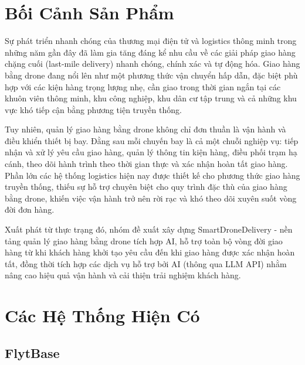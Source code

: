 \section{Bối Cảnh Sản Phẩm}

Sự phát triển nhanh chóng của thương mại điện tử và logistics thông minh trong những năm gần đây đã làm gia tăng đáng kể nhu cầu về các giải pháp giao hàng chặng cuối (last-mile delivery) nhanh chóng, chính xác và tự động hóa. Giao hàng bằng drone đang nổi lên như một phương thức vận chuyển hấp dẫn, đặc biệt phù hợp với các kiện hàng trọng lượng nhẹ, cần giao trong thời gian ngắn tại các khuôn viên thông minh, khu công nghiệp, khu dân cư tập trung và cả những khu vực khó tiếp cận bằng phương tiện truyền thống.

Tuy nhiên, quản lý giao hàng bằng drone không chỉ đơn thuần là vận hành và điều khiển thiết bị bay. Đằng sau mỗi chuyến bay là cả một chuỗi nghiệp vụ: tiếp nhận và xử lý yêu cầu giao hàng, quản lý thông tin kiện hàng, điều phối trạm hạ cánh, theo dõi hành trình theo thời gian thực và xác nhận hoàn tất giao hàng. Phần lớn các hệ thống logistics hiện nay được thiết kế cho phương thức giao hàng truyền thống, thiếu sự hỗ trợ chuyên biệt cho quy trình đặc thù của giao hàng bằng drone, khiến việc vận hành trở nên rời rạc và khó theo dõi xuyên suốt vòng đời đơn hàng.

Xuất phát từ thực trạng đó, nhóm đề xuất xây dựng SmartDroneDelivery - nền tảng quản lý giao hàng bằng drone tích hợp AI, hỗ trợ toàn bộ vòng đời giao hàng từ khi khách hàng khởi tạo yêu cầu đến khi giao hàng được xác nhận hoàn tất, đồng thời tích hợp các dịch vụ hỗ trợ bởi AI (thông qua LLM API) nhằm nâng cao hiệu quả vận hành và cải thiện trải nghiệm khách hàng.

\section{Các Hệ Thống Hiện Có}

\subsection{FlytBase}

